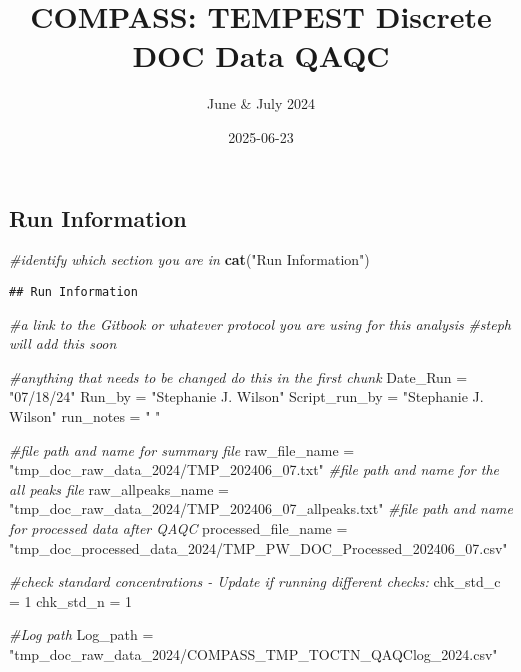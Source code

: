\documentclass[
]{article}
\title{COMPASS: TEMPEST Discrete DOC Data QAQC}
\author{June \& July 2024}
\date{2025-06-23}
\newenvironment{Shaded}{\begin{snugshade}}{\end{snugshade}}
\newcommand{\CommentTok}[1]{\textcolor[rgb]{0.56,0.35,0.01}{\textit{#1}}}
\newcommand{\DecValTok}[1]{\textcolor[rgb]{0.00,0.00,0.81}{#1}}
\newcommand{\FunctionTok}[1]{\textcolor[rgb]{0.13,0.29,0.53}{\textbf{#1}}}
\newcommand{\NormalTok}[1]{#1}
\newcommand{\OtherTok}[1]{\textcolor[rgb]{0.56,0.35,0.01}{#1}}
\newcommand{\StringTok}[1]{\textcolor[rgb]{0.31,0.60,0.02}{#1}}
\begin{document}
\maketitle

\hypertarget{run-information}{%
\subsection{Run Information}\label{run-information}}

\begin{Shaded}
\begin{Highlighting}[]
\CommentTok{\#identify which section you are in }
\FunctionTok{cat}\NormalTok{(}\StringTok{"Run Information"}\NormalTok{)}
\end{Highlighting}
\end{Shaded}

\begin{verbatim}
## Run Information
\end{verbatim}

\begin{Shaded}
\begin{Highlighting}[]
\CommentTok{\#a link to the Gitbook or whatever protocol you are using for this analysis }
  \CommentTok{\#steph will add this soon }
  
\CommentTok{\#anything that needs to be changed do this in the first chunk}
\NormalTok{  Date\_Run }\OtherTok{=} \StringTok{"07/18/24"}
\NormalTok{  Run\_by }\OtherTok{=} \StringTok{"Stephanie J. Wilson"}
\NormalTok{  Script\_run\_by }\OtherTok{=} \StringTok{"Stephanie J. Wilson"}
\NormalTok{  run\_notes }\OtherTok{=} \StringTok{" "}
  
  \CommentTok{\#file path and name for summary file }
\NormalTok{    raw\_file\_name }\OtherTok{=} \StringTok{"tmp\_doc\_raw\_data\_2024/TMP\_202406\_07.txt"} 
  \CommentTok{\#file path and name for the all peaks file }
\NormalTok{    raw\_allpeaks\_name }\OtherTok{=} \StringTok{"tmp\_doc\_raw\_data\_2024/TMP\_202406\_07\_allpeaks.txt"}
  \CommentTok{\#file path and name for processed data after QAQC}
\NormalTok{    processed\_file\_name }\OtherTok{=} \StringTok{"tmp\_doc\_processed\_data\_2024/TMP\_PW\_DOC\_Processed\_202406\_07.csv"}

\CommentTok{\#check standard concentrations {-} Update if running different checks: }
\NormalTok{   chk\_std\_c }\OtherTok{=} \DecValTok{1}
\NormalTok{   chk\_std\_n }\OtherTok{=} \DecValTok{1}
    
\CommentTok{\#Log path }
\NormalTok{    Log\_path }\OtherTok{=} \StringTok{"tmp\_doc\_raw\_data\_2024/COMPASS\_TMP\_TOCTN\_QAQClog\_2024.csv"}
\end{Highlighting}
\end{Shaded}
\end{document}
